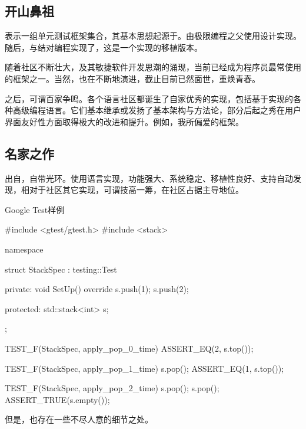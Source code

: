 \begin{content}

\subsection{开山鼻祖}

表示一组单元测试框架集合，其基本思想起源于。由极限编程之父使用设计实现。随后，与结对编程实现了，这是一个实现的移植版本。

随着社区不断壮大，及其敏捷软件开发思潮的涌现，当前已经成为程序员最常使用的框架之一。当然，也在不断地演进，截止目前已然面世，重焕青春。

之后，可谓百家争鸣。各个语言社区都诞生了自家优秀的实现，包括基于实现的各种高级编程语言。它们基本继承或发扬了基本架构与方法论，部分后起之秀在用户界面友好性方面取得极大的改进和提升。例如，我所偏爱的框架。

\subsection{名家之作}

出自，自带光环。使用\cpp{}语言实现，功能强大、系统稳定、移植性良好、支持自动发现，相对于\cpp{}社区其它实现，可谓技高一筹，在\cpp{}社区占据主导地位。

\begin{nodiff}{Google Test样例}
 \begin{c++}
#include <gtest/gtest.h>
#include <stack>

namespace {
  struct StackSpec : testing::Test {
  private:
    void SetUp() override {
      s.push(1);
      s.push(2);
    }

  protected:
    std::stack<int> s;
  };
}

TEST_F(StackSpec, apply_pop_0_time) {
  ASSERT_EQ(2, s.top());
}

TEST_F(StackSpec, apply_pop_1_time) {
  s.pop();
  ASSERT_EQ(1, s.top());
}

TEST_F(StackSpec, apply_pop_2_time) {
  s.pop();
  s.pop();
  ASSERT_TRUE(s.empty());
}
 \end{c++}
\end{nodiff}

但是，也存在一些不尽人意的细节之处。


\end{content}
